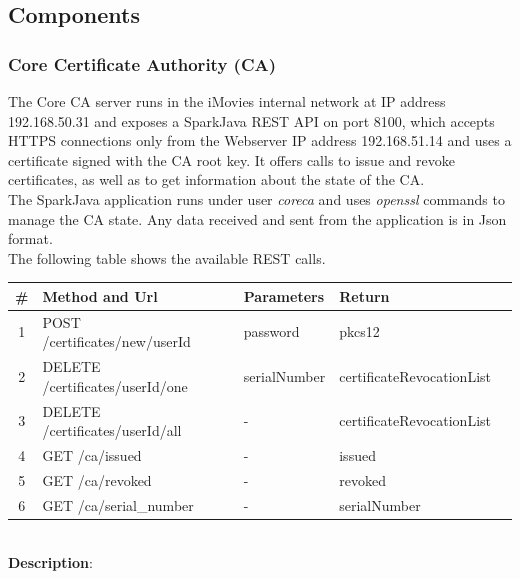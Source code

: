 \documentclass[english]{article}
\begin{document}
\subsection{Components}

\subsubsection{Core Certificate Authority (CA)}
The Core CA server runs in the iMovies internal network at IP address 192.168.50.31 and exposes a SparkJava REST API on port 8100, which accepts HTTPS connections only from the Webserver IP address 192.168.51.14 and uses a certificate signed with the CA root key. It offers calls to issue and revoke certificates, as well as to get information about the state of the CA.\\
The SparkJava application runs under user \emph{coreca} and uses \emph{openssl} commands to manage the CA state. Any data received and sent from the application is in Json format.\\
The following table shows the available REST calls.
\\
\begin{tabular} {| c | l | l | l | l |}
\hline
\textbf{\#} & \textbf{Method and Url} & \textbf{Parameters} & \textbf{Return}\\
\hline
1 & POST /certificates/new/userId & password & pkcs12\\
\hline
2 & DELETE /certificates/userId/one & serialNumber & certificateRevocationList\\
\hline
3 & DELETE /certificates/userId/all & - & certificateRevocationList\\
\hline
4 & GET /ca/issued & - & issued\\
\hline
5 & GET /ca/revoked & - & revoked\\
\hline
6 & GET /ca/serial\_number & - & serialNumber\\
\hline
\end{tabular}
\\
\textbf{Description}:
\end{document}
